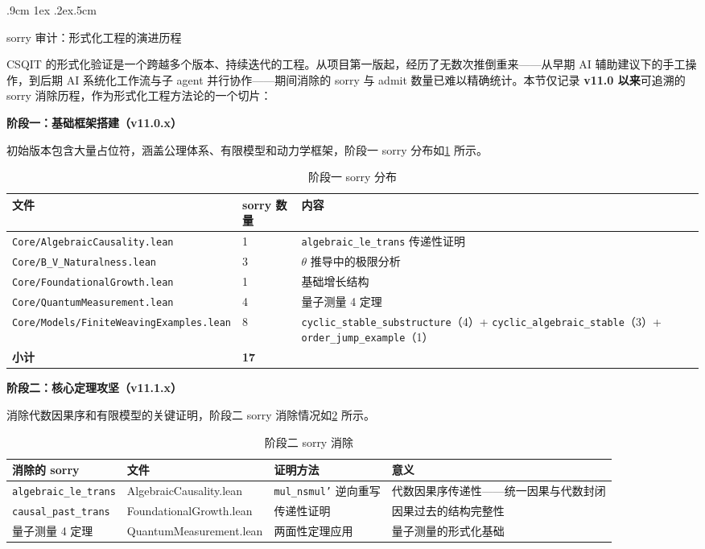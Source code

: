 \documentclass[aps,prd,twocolumn,nofootinbib,floatfix]{revtex4-2}
\makeatletter
\def\subsection{%
  \@startsection{subsection}{2}{\z@}
    {.9cm \@plus1ex \@minus .2ex}{.5cm}
    {\normalfont\large\bfseries\raggedright}%
}
\makeatother
\begin{document}
\subsection{sorry 审计：形式化工程的演进历程}

CSQIT 的形式化验证是一个跨越多个版本、持续迭代的工程。从项目第一版起，经历了无数次推倒重来——从早期 AI 辅助建议下的手工操作，到后期 AI 系统化工作流与子 agent 并行协作——期间消除的 sorry 与 admit 数量已难以精确统计。本节仅记录 \textbf{v11.0 以来}可追溯的 sorry 消除历程，作为形式化工程方法论的一个切片：

\textbf{阶段一：基础框架搭建（v11.0.x）}

初始版本包含大量占位符，涵盖公理体系、有限模型和动力学框架，阶段一 sorry 分布如\cref{tab:sorry1} 所示。

\begin{table}[!t]
\centering
\scriptsize
\begin{tabular}{p{5.5cm}p{1cm}p{8cm}}
\hline
文件 & sorry 数量 & 内容 \\
\hline
\texttt{Core/AlgebraicCausality.lean} & 1 & \texttt{algebraic\_le\_trans} 传递性证明 \\
\texttt{Core/B\_V\_Naturalness.lean} & 3 & $\theta$ 推导中的极限分析 \\
\texttt{Core/FoundationalGrowth.lean} & 1 & 基础增长结构 \\
\texttt{Core/QuantumMeasurement.lean} & 4 & 量子测量 4 定理 \\
\texttt{Core/Models/FiniteWeavingExamples.lean} & 8 & \texttt{cyclic\_stable\_substructure}（4）+ \texttt{cyclic\_algebraic\_stable}（3）+ \texttt{order\_jump\_example}（1） \\
\textbf{小计} & \textbf{17} & \\
\hline
\end{tabular}
\caption{阶段一 sorry 分布}
\label{tab:sorry1}
\end{table}

\textbf{阶段二：核心定理攻坚（v11.1.x）}

消除代数因果序和有限模型的关键证明，阶段二 sorry 消除情况如\cref{tab:sorry2} 所示。

\begin{table}[!t]
\centering
\scriptsize
\begin{tabular}{p{3cm}p{4cm}p{4cm}p{4cm}}
\hline
消除的 sorry & 文件 & 证明方法 & 意义 \\
\hline
\texttt{algebraic\_le\_trans} & AlgebraicCausality.lean & \texttt{mul\_nsmul'} 逆向重写 & 代数因果序传递性——统一因果与代数封闭 \\
\texttt{causal\_past\_trans} & FoundationalGrowth.lean & 传递性证明 & 因果过去的结构完整性 \\
量子测量 4 定理 & QuantumMeasurement.lean & 两面性定理应用 & 量子测量的形式化基础 \\
\hline
\end{tabular}
\caption{阶段二 sorry 消除}
\label{tab:sorry2}
\end{table}
\end{document}
